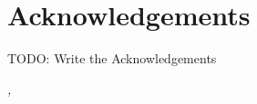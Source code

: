 \section*{Acknowledgements}

TODO: Write the Acknowledgements

\begin{comment}
\noindent \lorem

\vspace{0.3cm}
\noindent \lorem
\end{comment}

\vspace{1cm}
\noindent\textit{\UnivPlace, \GraduationDate}
\hfill \AuthorName\ \AuthorSurname
